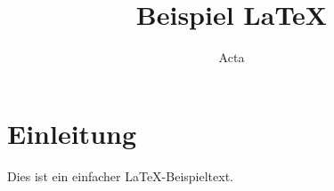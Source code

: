 \documentclass{article}
\title{Beispiel LaTeX}
\author{Acta}
\begin{document}
\maketitle
\section{Einleitung}
Dies ist ein einfacher \LaTeX-Beispieltext.
\end{document}
